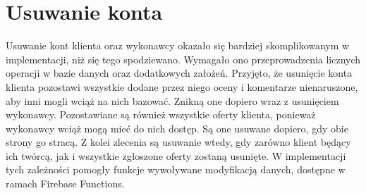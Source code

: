 \section{Usuwanie konta}

Usuwanie kont klienta oraz wykonawcy okazało się bardziej skomplikowanym w implementacji, niż się tego spodziewano. Wymagało ono przeprowadzenia licznych operacji w bazie danych oraz dodatkowych założeń. Przyjęto, że usunięcie konta klienta pozostawi wszystkie dodane przez niego oceny i komentarze nienaruszone, aby inni mogli wciąż na nich bazować. Znikną one dopiero wraz z usunięciem wykonawcy. Pozostawiane są również wszystkie oferty klienta, ponieważ wykonawcy wciąż mogą mieć do nich dostęp. Są one usuwane dopiero, gdy obie strony go stracą. Z kolei zlecenia są usuwanie wtedy, gdy zarówno klient będący ich twórcą, jak i wszystkie zgłoszone oferty zostaną usunięte. W implementacji tych zależności pomogły funkcje wywoływane modyfikacją danych, dostępne w ramach Firebase Functions. 

